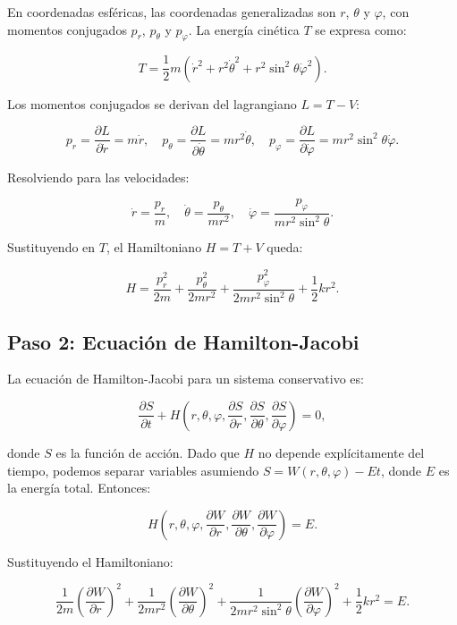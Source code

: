 \documentclass[12pt]{article}
\begin{document}
\begin{enumerate}
  En coordenadas esféricas, las coordenadas generalizadas son \( r \), \( \theta \) y \( \varphi \), con momentos conjugados \( p_r \), \( p_\theta \) y \( p_\varphi \). La energía cinética \( T \) se expresa como:

  \[
  T = \frac{1}{2} m \left( \dot{r}^2 + r^2 \dot{\theta}^2 + r^2 \sin^2 \theta \dot{\varphi}^2 \right).
  \]

  Los momentos conjugados se derivan del lagrangiano \( L = T - V \):

  \[
  p_r = \frac{\partial L}{\partial \dot{r}} = m \dot{r}, \quad p_\theta = \frac{\partial L}{\partial \dot{\theta}} = m r^2 \dot{\theta}, \quad p_\varphi = \frac{\partial L}{\partial \dot{\varphi}} = m r^2 \sin^2 \theta \dot{\varphi}.
  \]

  Resolviendo para las velocidades:

  \[
  \dot{r} = \frac{p_r}{m}, \quad \dot{\theta} = \frac{p_\theta}{m r^2}, \quad \dot{\varphi} = \frac{p_\varphi}{m r^2 \sin^2 \theta}.
  \]

  Sustituyendo en \( T \), el Hamiltoniano \( H = T + V \) queda:

  \[
  H = \frac{p_r^2}{2m} + \frac{p_\theta^2}{2m r^2} + \frac{p_\varphi^2}{2m r^2 \sin^2 \theta} + \frac{1}{2} k r^2.
  \]

  \subsection*{Paso 2: Ecuación de Hamilton-Jacobi}

  La ecuación de Hamilton-Jacobi para un sistema conservativo es:

  \[
  \frac{\partial S}{\partial t} + H \left( r, \theta, \varphi, \frac{\partial S}{\partial r}, \frac{\partial S}{\partial \theta}, \frac{\partial S}{\partial \varphi} \right) = 0,
  \]

  donde \( S \) es la función de acción. Dado que \( H \) no depende explícitamente del tiempo, podemos separar variables asumiendo \( S = W(r, \theta, \varphi) - E t \), donde \( E \) es la energía total. Entonces:

  \[
  H \left( r, \theta, \varphi, \frac{\partial W}{\partial r}, \frac{\partial W}{\partial \theta}, \frac{\partial W}{\partial \varphi} \right) = E.
  \]

  Sustituyendo el Hamiltoniano:

  \[
  \frac{1}{2m} \left( \frac{\partial W}{\partial r} \right)^2 + \frac{1}{2m r^2} \left( \frac{\partial W}{\partial \theta} \right)^2 + \frac{1}{2m r^2 \sin^2 \theta} \left( \frac{\partial W}{\partial \varphi} \right)^2 + \frac{1}{2} k r^2 = E.
  \]


\end{enumerate}
\end{document}
